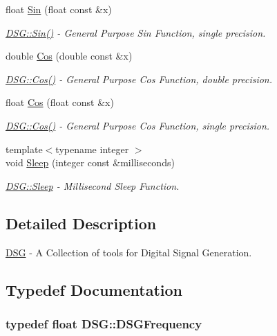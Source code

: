 \begin{DoxyCompactItemize}
float \hyperlink{namespace_d_s_g_aa2f9baa8896fff266c5e7ee73fb5c3d5}{Sin} (float const \&x)
\begin{DoxyCompactList}\small\item\em \hyperlink{namespace_d_s_g_aad63d316081c7d13a551acf346ee2749}{D\+S\+G\+::\+Sin()} -\/ General Purpose Sin Function, single precision. \end{DoxyCompactList}\item 
double \hyperlink{namespace_d_s_g_ade303ad15c77f534429305c3cbd90191}{Cos} (double const \&x)
\begin{DoxyCompactList}\small\item\em \hyperlink{namespace_d_s_g_ade303ad15c77f534429305c3cbd90191}{D\+S\+G\+::\+Cos()} -\/ General Purpose Cos Function, double precision. \end{DoxyCompactList}\item 
float \hyperlink{namespace_d_s_g_a214b00c1735dd1976757f284dfe6fb1f}{Cos} (float const \&x)
\begin{DoxyCompactList}\small\item\em \hyperlink{namespace_d_s_g_ade303ad15c77f534429305c3cbd90191}{D\+S\+G\+::\+Cos()} -\/ General Purpose Cos Function, single precision. \end{DoxyCompactList}\item 
{\footnotesize template$<$typename integer $>$ }\\void \hyperlink{namespace_d_s_g_a012c968132bda114752f8ae012a1f441}{Sleep} (integer const \&milliseconds)
\begin{DoxyCompactList}\small\item\em \hyperlink{namespace_d_s_g_a012c968132bda114752f8ae012a1f441}{D\+S\+G\+::\+Sleep} -\/ Millisecond Sleep Function. \end{DoxyCompactList}\end{DoxyCompactItemize}


\subsection{Detailed Description}
\hyperlink{namespace_d_s_g}{D\+S\+G} -\/ A Collection of tools for Digital Signal Generation. 

\subsection{Typedef Documentation}
\hypertarget{namespace_d_s_g_a4315a061386fa1014fda09b15d3a6973}{
\subsubsection[{D\+S\+G\+Frequency}]{\setlength{\rightskip}{0pt plus 5cm}typedef float {\bf D\+S\+G\+::\+D\+S\+G\+Frequency}}}\label{namespace_d_s_g_a4315a061386fa1014fda09b15d3a6973}


